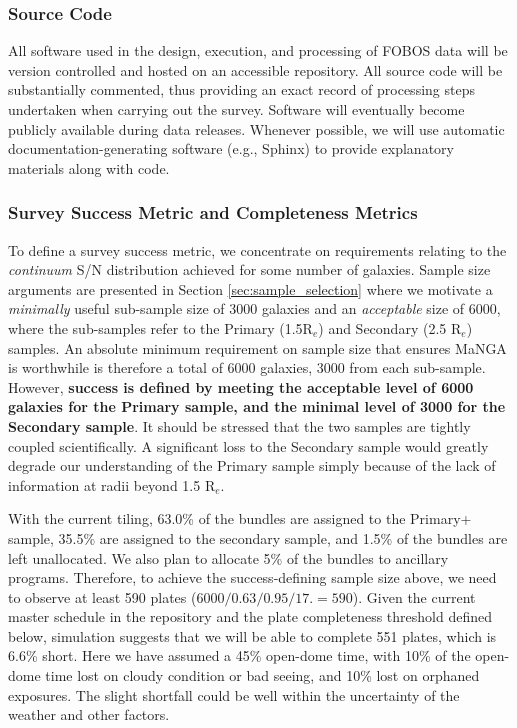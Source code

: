\documentclass[preprint,11pt]{aastex}
\newcommand{\Reff}{{R$_{e}$}}
\begin{document}
\subsubsection{Source Code}

All software used in the design, execution, and processing of FOBOS data will be version controlled and hosted on an
accessible repository.  All source code will be substantially commented, thus
providing an exact record of processing steps undertaken when carrying out the survey.  Software will eventually become
publicly available during data releases.  Whenever possible, we will use automatic documentation-generating software
(e.g., Sphinx) to provide explanatory materials along with code.








\subsubsection{Survey Success Metric and Completeness Metrics}

To define a survey success metric, we concentrate on requirements relating to the {\em continuum} S/N distribution
achieved for some number of galaxies.  Sample size arguments are presented in Section \ref{sec:sample_selection} where
we motivate a {\em minimally} useful sub-sample size of 3000 galaxies and an {\em acceptable} size of 6000, where the
sub-samples refer to the Primary (1.5\Reff) and Secondary (2.5 \Reff) samples.  An absolute minimum requirement on
sample size that ensures MaNGA is worthwhile is therefore a total of 6000 galaxies, 3000 from each sub-sample.
However, {\bf success is defined by meeting the acceptable level of 6000 galaxies for the Primary sample, and the
minimal level of 3000 for the Secondary sample}.  It should be stressed that the two samples are tightly coupled
scientifically.  A significant loss to the Secondary sample would greatly degrade our understanding of the Primary
sample simply because of the lack of information at radii beyond 1.5 \Reff.

With the current tiling, 63.0\% of the bundles are assigned to the Primary+ sample, 35.5\% are assigned to the secondary sample, and 1.5\% of the bundles are left unallocated. We also plan to allocate 5\% of the bundles to ancillary programs. Therefore, to achieve the success-defining sample size above, we need to observe at least 590 plates ($6000/0.63/0.95/17.= 590$). 
Given the current master schedule in the repository and the plate completeness threshold defined below, simulation suggests that we will be able to complete 551 plates, which is 6.6\% short. Here we have assumed a 45\% open-dome time, with 10\% of the open-dome time lost on cloudy condition or bad seeing, and 10\% lost on orphaned exposures. The slight shortfall could be well within the uncertainty of the weather and other factors. 
\end{document}
